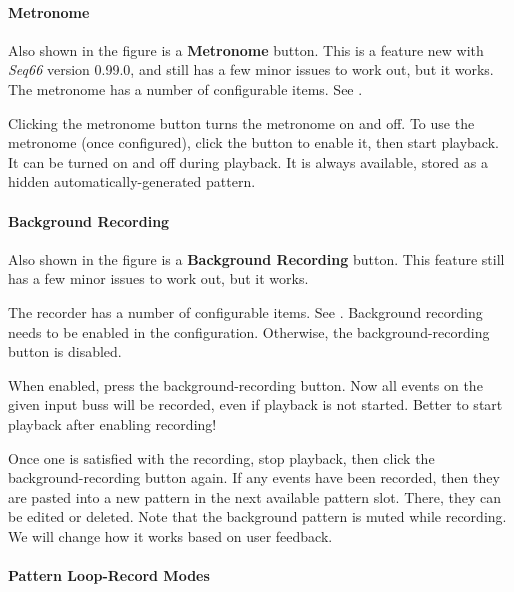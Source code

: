 \paragraph{Metronome}
\label{paragraph:patterns_metronome}

   Also shown in the figure is a \textbf{Metronome} button.
   This is a feature new with \textsl{Seq66} version 0.99.0, and still has a few
   minor issues to work out, but it works.
   The metronome has a number of configurable items.
   See .

   Clicking the metronome button turns the metronome on and off.
   To use the metronome (once configured), click the button to enable it,
   then start playback.
   It can be turned on and off during playback.
   It is always available, stored as a hidden automatically-generated
   pattern.

\paragraph{Background Recording}
\label{paragraph:patterns_background_recording}

   Also shown in the figure is a \textbf{Background Recording} button.
   This feature still has a few
   minor issues to work out, but it works.

   The recorder has a number of configurable items.
   See .
   Background recording needs to be enabled in the configuration.
   Otherwise, the background-recording button is disabled.

   When enabled, press the background-recording button.  Now all events on the
   given input buss will be recorded, even if playback is not started.
   Better to start playback after enabling recording!

   Once one is satisfied with the recording, stop playback, then
   click the background-recording button again.
   If any events have been recorded, then they are pasted into a new pattern in
   the next available pattern slot.
   There, they can be edited or deleted.
   Note that the background pattern is muted while recording.
   We will change how it works based on user feedback.

\paragraph{Pattern Loop-Record Modes}
\label{paragraph:patterns_loop_modes}


